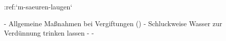 :ref:`m-saeuren-laugen`
\begin{itemize}
  -   Allgemeine Maßnahmen bei Vergiftungen
  ()
  -   Schluckweise Wasser zur Verdünnung trinken lassen
  -   
  -   
\end{itemize}